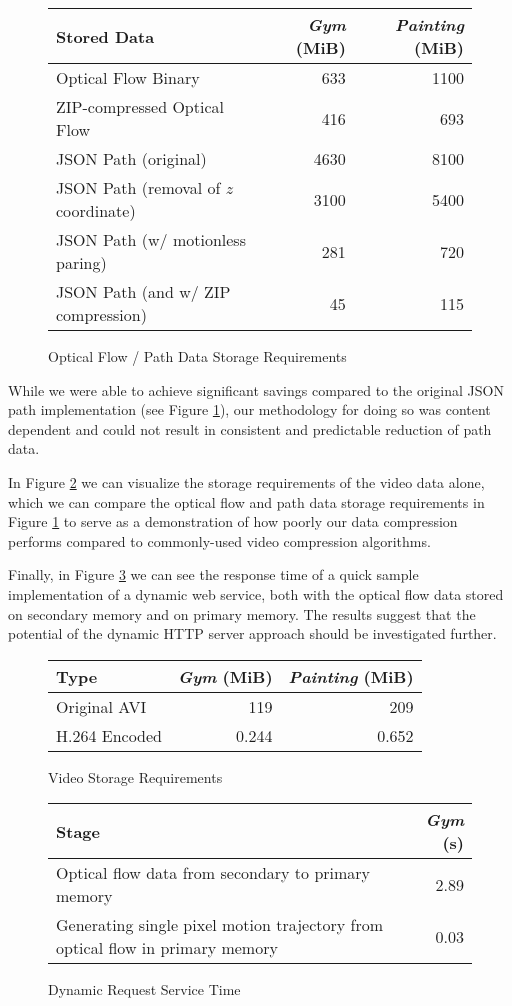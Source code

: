 \begin{figure}
\centering
\caption{Optical Flow / Path Data Storage Requirements}
\label{conclusionresults}
\begin{tabular}{l | r | r}
\textbf{Stored Data} & \textbf{\textit{Gym}} (MiB) & \textbf{\textit{Painting}} (MiB) \\
\hline
Optical Flow Binary & 633 & 1100 \\
ZIP-compressed Optical Flow & 416 & 693 \\
JSON Path (original) & 4630 & 8100 \\
JSON Path (removal of $z$ coordinate) & 3100 & 5400 \\
JSON Path (w/ motionless paring) & 281 & 720 \\
JSON Path (and w/ ZIP compression) & 45 & 115
\end{tabular}
\end{figure}

\par While we were able to achieve significant savings compared to the original JSON path implementation (see Figure \ref{conclusionresults}), our methodology for doing so was content dependent and could not result in consistent and predictable reduction of path data. 

\par In Figure \ref{conclusionvideo} we can visualize the storage requirements of the video data alone, which we can compare the optical flow and path data storage requirements in Figure \ref{conclusionresults} to serve as a demonstration of how poorly our data compression performs compared to commonly-used video compression algorithms.

\par Finally, in Figure \ref{conclusiontime} we can see the response time of a quick sample implementation of a dynamic web service, both with the optical flow data stored on secondary memory and on primary memory. The results suggest that the potential of the dynamic HTTP server approach should be investigated further.

\begin{figure}
\centering
\caption{Video Storage Requirements}
\label{conclusionvideo}
\begin{tabular}{l | r | r}
\textbf{Type} & \textbf{\textit{Gym}} (MiB) & \textbf{\textit{Painting}} (MiB) \\
\hline
Original AVI & 119 & 209 \\
H.264 Encoded & 0.244 & 0.652 \\
\end{tabular}
\end{figure}

\begin{figure}
\centering
\caption{Dynamic Request Service Time}
\label{conclusiontime}
\begin{tabular}{l | r}
\textbf{Stage} & \textbf{\textit{Gym}} (s) \\
\hline
Optical flow data from secondary to primary memory & 2.89 \\
Generating single pixel motion trajectory from optical flow in primary memory & 0.03
\end{tabular}
\end{figure}

